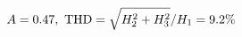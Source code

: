 \documentclass[preview]{standalone}
\begin{document}
\begin{align*}
\special{dvisvgm:raw <g id='unique000'>}A=0.47,\ \text{THD}=\sqrt{H_2^2+H_3^2}/H_1=9.2\%\special{dvisvgm:raw </g>}
\end{align*}
\end{document}
